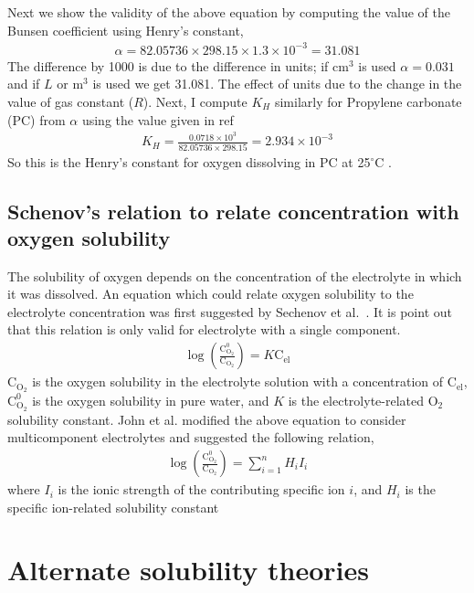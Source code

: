 \documentclass[12pt]{book}
\begin{document}
Next we show the validity of the above equation by computing the value of the Bunsen coefficient using Henry's constant,
\begin{align}
	\alpha = 82.05736\times 298.15\times 1.3\times 10^{-3} = 31.081
\end{align}
The difference by 1000 is due to the difference in units; if cm$^3$ is used $\alpha = 0.031$ and if $L$ or m$^3$ is used we get 31.081. The effect of units due to the change in the value of gas constant ($R$).  
Next, I compute $K_H$ similarly for Propylene carbonate (PC) from $\alpha$ using the value given in ref~\cite{Read2003}
\begin{align}
K_H = \frac{0.0718\times 10^3}{82.05736\times 298.15}  = 2.934\times 10^{-3}
\end{align}
So this is the Henry's constant for oxygen dissolving in PC at 25$^\circ$C . 

\subsection{Schenov's relation to relate concentration with oxygen solubility} The solubility of oxygen depends on the concentration of the electrolyte in which it was dissolved. An equation which could relate oxygen solubility to the electrolyte concentration was first suggested by Sechenov et al.~\cite{Schumpe1978}. It is point out that this relation is only valid for electrolyte with a single component.  
\begin{align}
\log{\left(\frac{\textrm{C}_{\textrm{O}_2}^0}{\textrm{C}_{\textrm{O}_2}}\right)}=K\textrm{C}_{\textrm{el}}
\label{Schenov salting out in single component electrolyte}
\end{align}
$\textrm{C}_{\textrm{O}_2}$ is the oxygen solubility in the electrolyte solution with a concentration of $\textrm{C}_{\textrm{el}}$, $\textrm{C}_{\textrm{O}_2}^0$ is the oxygen solubility in pure water, and $K$ is the electrolyte-related $\textrm{O}_2$ solubility constant.
John et al.\cite{Schumpe1978} modified the above equation to consider multicomponent electrolytes and suggested the following relation,
\begin{align}
\log{\left(\frac{\textrm{C}_{\textrm{O}_2}^0}{\textrm{C}_{\textrm{O}_2}}\right)}=\sum_{i=1}^{n}H_iI_i
\label{Schumpe salting out relation}
\end{align}
where $I_i$ is the ionic strength of the contributing specific ion $i$, and $H_i$ is the specific ion-related solubility constant

\section{Alternate solubility theories}
\end{document}
